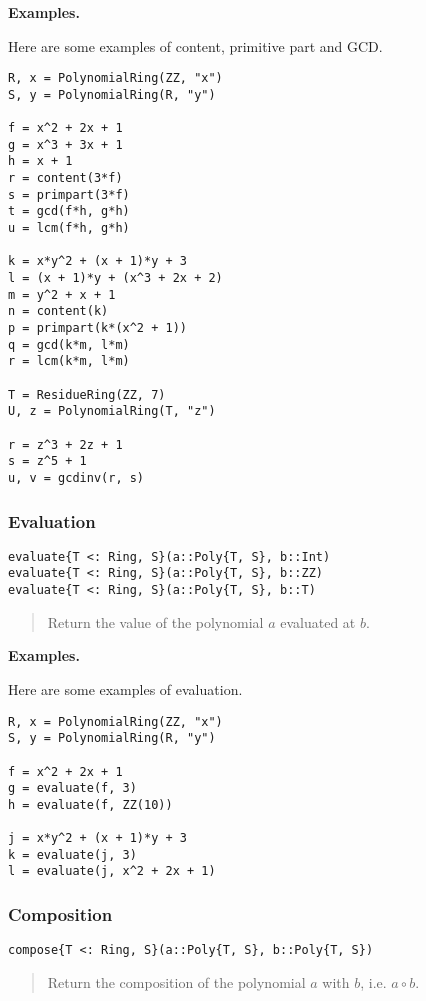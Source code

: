 \documentclass[a4paper,10pt]{article}
\newcommand{\desc}[1]{\vspace{-3mm}\begin{quote}#1\end{quote}}
\begin{document}
{{{\textbf{Examples.}

Here are some examples of content, primitive part and GCD.

\begin{lstlisting}
R, x = PolynomialRing(ZZ, "x")
S, y = PolynomialRing(R, "y")

f = x^2 + 2x + 1
g = x^3 + 3x + 1
h = x + 1
r = content(3*f)
s = primpart(3*f)
t = gcd(f*h, g*h)
u = lcm(f*h, g*h)

k = x*y^2 + (x + 1)*y + 3
l = (x + 1)*y + (x^3 + 2x + 2)
m = y^2 + x + 1
n = content(k)
p = primpart(k*(x^2 + 1))
q = gcd(k*m, l*m)
r = lcm(k*m, l*m)

T = ResidueRing(ZZ, 7)
U, z = PolynomialRing(T, "z")

r = z^3 + 2z + 1
s = z^5 + 1
u, v = gcdinv(r, s)
\end{lstlisting}

\subsubsection{Evaluation}

\begin{lstlisting}
evaluate{T <: Ring, S}(a::Poly{T, S}, b::Int)
evaluate{T <: Ring, S}(a::Poly{T, S}, b::ZZ)
evaluate{T <: Ring, S}(a::Poly{T, S}, b::T)
\end{lstlisting}

\desc{Return the value of the polynomial $a$ evaluated at $b$.}

\textbf{Examples.}

Here are some examples of evaluation.

\begin{lstlisting}
R, x = PolynomialRing(ZZ, "x")
S, y = PolynomialRing(R, "y")

f = x^2 + 2x + 1
g = evaluate(f, 3)
h = evaluate(f, ZZ(10))

j = x*y^2 + (x + 1)*y + 3
k = evaluate(j, 3)
l = evaluate(j, x^2 + 2x + 1)
\end{lstlisting}

\subsubsection{Composition}

\begin{lstlisting}
compose{T <: Ring, S}(a::Poly{T, S}, b::Poly{T, S})
\end{lstlisting}

\desc{Return the composition of the polynomial $a$ with $b$, i.e. $a \circ b$.}

}}}
\end{document}
